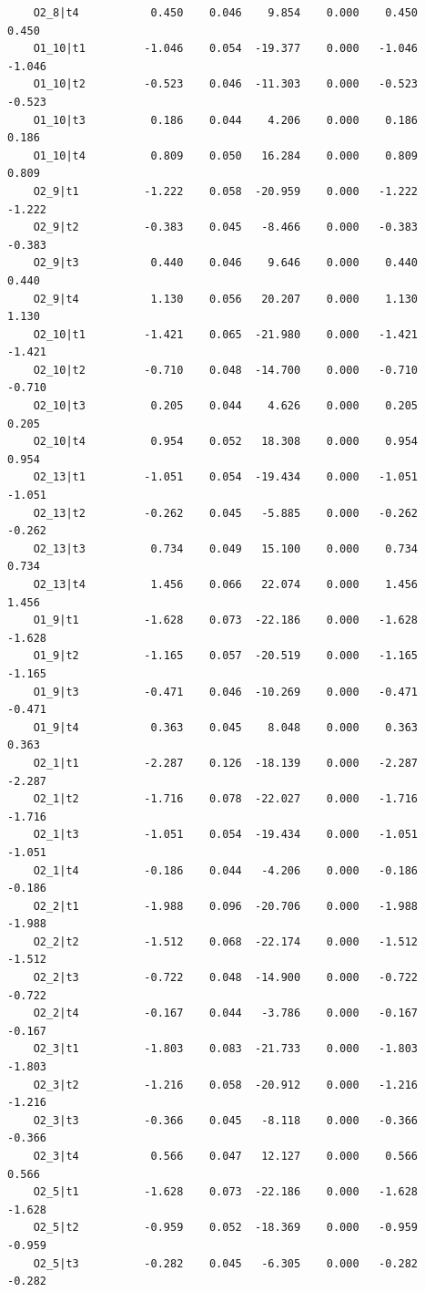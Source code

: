 \documentclass[
  letterpaper,
  DIV=11,
  numbers=noendperiod]{scrartcl}
\begin{document}
\begin{verbatim}
    O2_8|t4           0.450    0.046    9.854    0.000    0.450    0.450
    O1_10|t1         -1.046    0.054  -19.377    0.000   -1.046   -1.046
    O1_10|t2         -0.523    0.046  -11.303    0.000   -0.523   -0.523
    O1_10|t3          0.186    0.044    4.206    0.000    0.186    0.186
    O1_10|t4          0.809    0.050   16.284    0.000    0.809    0.809
    O2_9|t1          -1.222    0.058  -20.959    0.000   -1.222   -1.222
    O2_9|t2          -0.383    0.045   -8.466    0.000   -0.383   -0.383
    O2_9|t3           0.440    0.046    9.646    0.000    0.440    0.440
    O2_9|t4           1.130    0.056   20.207    0.000    1.130    1.130
    O2_10|t1         -1.421    0.065  -21.980    0.000   -1.421   -1.421
    O2_10|t2         -0.710    0.048  -14.700    0.000   -0.710   -0.710
    O2_10|t3          0.205    0.044    4.626    0.000    0.205    0.205
    O2_10|t4          0.954    0.052   18.308    0.000    0.954    0.954
    O2_13|t1         -1.051    0.054  -19.434    0.000   -1.051   -1.051
    O2_13|t2         -0.262    0.045   -5.885    0.000   -0.262   -0.262
    O2_13|t3          0.734    0.049   15.100    0.000    0.734    0.734
    O2_13|t4          1.456    0.066   22.074    0.000    1.456    1.456
    O1_9|t1          -1.628    0.073  -22.186    0.000   -1.628   -1.628
    O1_9|t2          -1.165    0.057  -20.519    0.000   -1.165   -1.165
    O1_9|t3          -0.471    0.046  -10.269    0.000   -0.471   -0.471
    O1_9|t4           0.363    0.045    8.048    0.000    0.363    0.363
    O2_1|t1          -2.287    0.126  -18.139    0.000   -2.287   -2.287
    O2_1|t2          -1.716    0.078  -22.027    0.000   -1.716   -1.716
    O2_1|t3          -1.051    0.054  -19.434    0.000   -1.051   -1.051
    O2_1|t4          -0.186    0.044   -4.206    0.000   -0.186   -0.186
    O2_2|t1          -1.988    0.096  -20.706    0.000   -1.988   -1.988
    O2_2|t2          -1.512    0.068  -22.174    0.000   -1.512   -1.512
    O2_2|t3          -0.722    0.048  -14.900    0.000   -0.722   -0.722
    O2_2|t4          -0.167    0.044   -3.786    0.000   -0.167   -0.167
    O2_3|t1          -1.803    0.083  -21.733    0.000   -1.803   -1.803
    O2_3|t2          -1.216    0.058  -20.912    0.000   -1.216   -1.216
    O2_3|t3          -0.366    0.045   -8.118    0.000   -0.366   -0.366
    O2_3|t4           0.566    0.047   12.127    0.000    0.566    0.566
    O2_5|t1          -1.628    0.073  -22.186    0.000   -1.628   -1.628
    O2_5|t2          -0.959    0.052  -18.369    0.000   -0.959   -0.959
    O2_5|t3          -0.282    0.045   -6.305    0.000   -0.282   -0.282

\end{verbatim}
\end{document}
